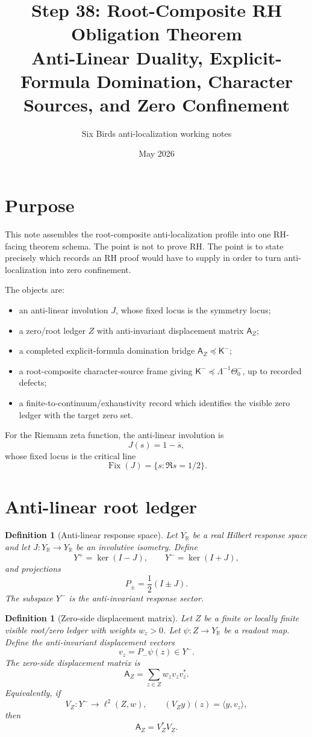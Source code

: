 \documentclass[11pt]{article}
\title{Step 38: Root-Composite RH Obligation Theorem\\
\large Anti-Linear Duality, Explicit-Formula Domination, Character Sources, and Zero Confinement}
\author{Six Birds anti-localization working notes}
\date{May 2026}
\newtheorem{definition}[theorem]{Definition}
\newcommand{\K}{\mathsf K}
\newcommand{\A}{\mathsf A}
\newcommand{\Fix}{\operatorname{Fix}}
\begin{document}
\maketitle

\section{Purpose}
This note assembles the root-composite anti-localization profile into one RH-facing theorem schema.  The point is not to prove RH.  The point is to state precisely which records an RH proof would have to supply in order to turn anti-localization into zero confinement.

The objects are:
\begin{itemize}[leftmargin=2em]
  \item an anti-linear involution \(J\), whose fixed locus is the symmetry locus;
  \item a zero/root ledger \(Z\) with anti-invariant displacement matrix \(\A_Z\);
  \item a completed explicit-formula domination bridge \(\A_Z\preceq \K^-\);
  \item a root-composite character-source frame giving \(\K^-\preceq \Lambda^{-1}\Theta_0^-\), up to recorded defects;
  \item a finite-to-continuum/exhaustivity record which identifies the visible zero ledger with the target zero set.
\end{itemize}

For the Riemann zeta function, the anti-linear involution is
\[
  J(s)=1-\overline{s},
\]
whose fixed locus is the critical line
\[
  \Fix(J)=\{s:\Re s=1/2\}.
\]

\section{Anti-linear root ledger}

\begin{definition}[Anti-linear response space]
Let \(Y_\mathbb R\) be a real Hilbert response space and let \(J:Y_\mathbb R\to Y_\mathbb R\) be an involutive isometry.  Define
\[
  Y^+=\ker(I-J),\qquad Y^-=\ker(I+J),
\]
and projections
\[
  P_\pm=\frac12(I\pm J).
\]
The subspace \(Y^-\) is the anti-invariant response sector.
\end{definition}

\begin{definition}[Zero-side displacement matrix]
Let \(Z\) be a finite or locally finite visible root/zero ledger with weights \(w_z>0\).  Let \(\psi:Z\to Y_\mathbb R\) be a readout map.  Define the anti-invariant displacement vectors
\[
  v_z=P_-\psi(z)\in Y^-.
\]
The zero-side displacement matrix is
\[
  \A_Z=\sum_{z\in Z} w_z v_zv_z^*.
\]
Equivalently, if
\[
  V_Z:Y^-\to \ell^2(Z,w),\qquad (V_Zy)(z)=\langle y,v_z\rangle,
\]
then
\[
  \A_Z=V_Z^*V_Z.
\]
\end{definition}
\end{document}
